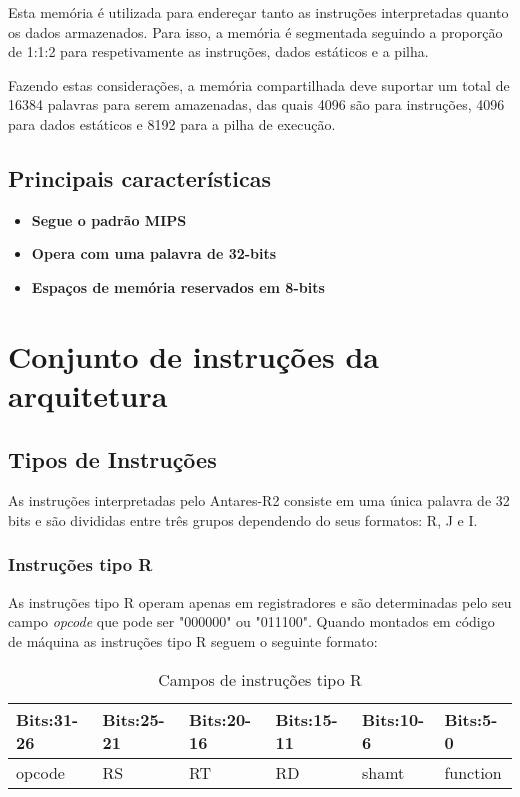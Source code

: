 \documentclass{report}
\begin{document}
Esta memória é utilizada para endereçar tanto as instruções interpretadas quanto os dados armazenados. Para isso, a memória é segmentada seguindo a proporção de 1:1:2 para respetivamente as instruções, dados estáticos e a pilha.

Fazendo estas considerações, a memória compartilhada deve suportar um total de 16384 palavras para serem amazenadas, das quais 4096 são para instruções, 4096 para dados estáticos e 8192 para a pilha de execução.
    
    
    
    
  \subsection{Principais características}
  \begin{itemize}
   \item \textbf{Segue o padrão MIPS}
   \item \textbf{Opera com uma palavra de 32-bits}
   \item \textbf{Espaços de memória reservados em 8-bits}
  \end{itemize}

\section{Conjunto de instruções da arquitetura}

\subsection{Tipos de Instruções}
As instruções interpretadas pelo Antares-R2 consiste em uma única palavra de 32 bits e são divididas entre três grupos dependendo do seus formatos: R, J e I.

\subsubsection{Instruções tipo R}
As instruções tipo R operam apenas em registradores e são determinadas pelo seu campo \textit{opcode} que pode ser "000000" ou "011100".
Quando montados em código de máquina as instruções tipo R seguem o seguinte formato:

\FloatBarrier
    \begin{table}[H]
      \begin{center}
        \begin{tabular}[pos]{|m{2.25cm} | m{1.875cm}| m{1.875cm}| m{1.875cm}| m{1.875cm}| m{2.25cm}|} 
          \hline
          \cellcolor[gray]{0.9}\textbf{Bits:31-26} &\cellcolor[gray]{0.9}\textbf{Bits:25-21} &\cellcolor[gray]{0.9}\textbf{Bits:20-16} &\cellcolor[gray]{0.9}\textbf{Bits:15-11} &\cellcolor[gray]{0.9}\textbf{Bits:10-6} & \cellcolor[gray]{0.9}\textbf{Bits:5-0} \\ \hline
              opcode  &  RS & RT & RD& shamt& function \\ \hline
        \end{tabular}
         \caption{Campos de instruções tipo R}
		\label{table:camposR}
      \end{center}
    \end{table}
\end{document}

